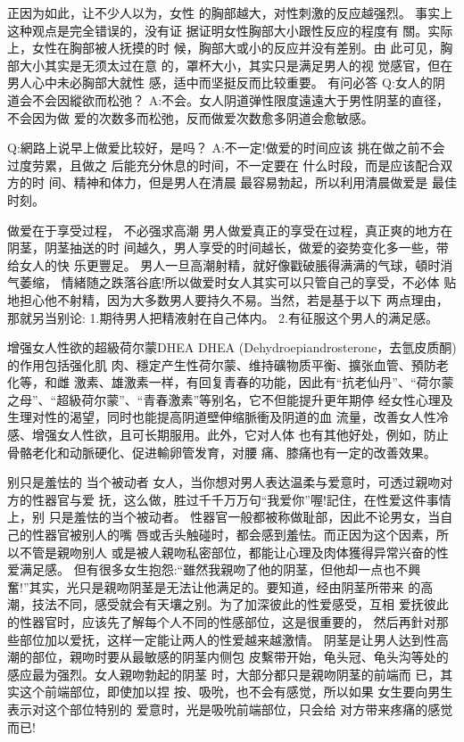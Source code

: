 \documentclass[12pt,UTF8]{ctexbook}
\begin{document}
正因为如此，让不少人以为，女性
的胸部越大，对性刺激的反应越强烈。
事实上这种观点是完全错误的，没有证
据证明女性胸部大小跟性反应的程度有
關。实际上，女性在胸部被人抚摸的时
候，胸部大或小的反应并没有差别。由
此可见，胸部大小其实是无须太过在意
的，罩杯大小，其实只是满足男人的视
觉感官，但在男人心中未必胸部大就性
感，适中而坚挺反而比较重要。
有问必答
Q:女人的阴道会不会因縱欲而松弛？
A:不会。女人阴道弹性限度遠遠大于男性阴茎的直径，不会因为做
爱的次数多而松弛，反而做爱次数愈多阴道会愈敏感。

Q:網路上说早上做爱比较好，是吗？
A:不一定!做爱的时间应该
挑在做之前不会过度劳累，且做之
后能充分休息的时间，不一定要在
什么时段，而是应该配合双方的时
间、精神和体力，但是男人在清晨
最容易勃起，所以利用清晨做爱是
最佳时刻。

做爱在于享受过程，
不必强求高潮
男人做爱真正的享受在过程，真正爽的地方在阴茎，阴茎抽送的时
间越久，男人享受的时间越长，做爱的姿势变化多一些，带给女人的快
乐更豐足。
男人一旦高潮射精，就好像戳破脹得满满的气球，頓时消气萎缩，
情緒随之跌落谷底!所以做爱时女人其实可以只管自己的享受，不必体
贴地担心他不射精，因为大多数男人要持久不易。当然，若是基于以下
两点理由，那就另当别论:
1.期待男人把精液射在自己体内。
2.有征服这个男人的满足感。

增强女人性欲的超級荷尔蒙DHEA
DHEA (Dehydroepiandrosterone，去氫皮质酮)的作用包括强化肌
肉、穩定产生性荷尔蒙、维持礦物质平衡、擴张血管、預防老化等，和雌
激素、雄激素一样，有回复青春的功能，因此有“抗老仙丹”、“荷尔蒙
之母”、“超級荷尔蒙”、“青春激素”等别名，它不但能提升更年期停
经女性心理及生理对性的渴望，同时也能提高阴道壁伸缩脈衝及阴道的血
流量，改善女人性冷感、增强女人性欲，且可长期服用。此外，它对人体
也有其他好处，例如，防止骨骼老化和动脈硬化、促进輸卵管发育，对腰
痛、膝痛也有一定的改善效果。

别只是羞怯的
当个被动者
女人，当你想对男人表达温柔与爱意时，可透过親吻对方的性器官与爱
抚，这么做，胜过千千万万句“我爱你”喔!記住，在性爱这件事情上，别
只是羞怯的当个被动者。
性器官一般都被称做耻部，因此不论男女，当自己的性器官被别人的嘴
唇或舌头触碰时，都会感到羞怯。而正因为这个因素，所以不管是親吻别人
或是被人親吻私密部位，都能让心理及肉体獲得异常兴奋的性爱满足感。
但有很多女生抱怨:“雖然我親吻了他的阴茎，但他却一点也不興
奮!”其实，光只是親吻阴茎是无法让他满足的。要知道，经由阴茎所带来
的高潮，技法不同，感受就会有天壤之别。为了加深彼此的性爱感受，互相
爱抚彼此的性器官时，应该先了解每个人不同的性感部位，这是很重要的，
然后再針对那些部位加以爱抚，这样一定能让两人的性爱越来越激情。
阴茎是让男人达到性高潮的部位，親吻时要从最敏感的阴茎内侧包
皮繫带开始，龟头冠、龟头沟等处的
感应最为强烈。女人親吻勃起的阴茎
时，大部分都只是親吻阴茎的前端而
已，其实这个前端部位，即使加以捏
按、吸吮，也不会有感觉，所以如果
女生要向男生表示对这个部位特别的
爱意时，光是吸吮前端部位，只会给
对方带来疼痛的感觉而已!
\end{document}
